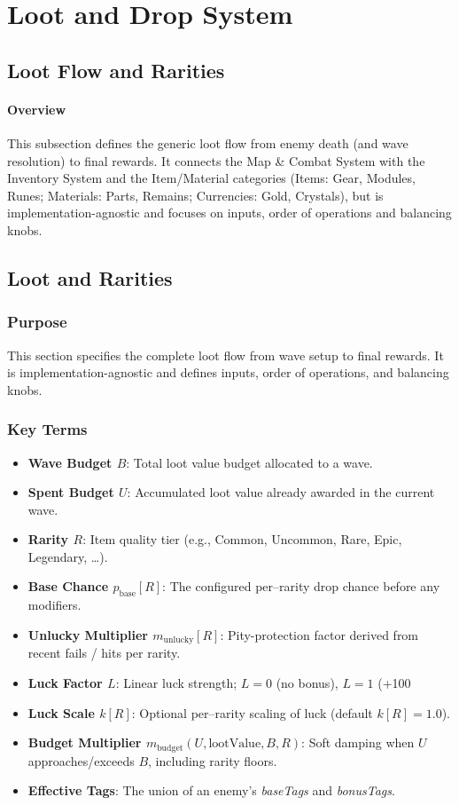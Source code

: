 
\section{Loot and Drop System}
\label{sec:loot-system}

\subsection{Loot Flow and Rarities}

\paragraph{Overview}
This subsection defines the generic loot flow from enemy death (and wave resolution) to final rewards.
It connects the Map \& Combat System with the Inventory System and the Item/Material categories
(Items: Gear, Modules, Runes; Materials: Parts, Remains; Currencies: Gold, Crystals),
but is implementation-agnostic and focuses on inputs, order of operations and balancing knobs.

\subsection{Loot and Rarities}
\subsubsection*{Purpose}
This section specifies the complete loot flow from wave setup to final rewards. It is implementation-agnostic and defines inputs, order of operations, and balancing knobs.

\subsubsection*{Key Terms}
\begin{itemize}
	\item \textbf{Wave Budget $B$}: Total loot value budget allocated to a wave.
	\item \textbf{Spent Budget $U$}: Accumulated loot value already awarded in the current wave.
	\item \textbf{Rarity $R$}: Item quality tier (e.g., Common, Uncommon, Rare, Epic, Legendary, \dots).
	\item \textbf{Base Chance $p_{\text{base}}[R]$}: The configured per–rarity drop chance before any modifiers.
	\item \textbf{Unlucky Multiplier $m_{\text{unlucky}}[R]$}: Pity-protection factor derived from recent fails / hits per rarity.
	\item \textbf{Luck Factor $L$}: Linear luck strength; $L=0$ (no bonus), $L=1$ (+100%
	\item \textbf{Luck Scale $k[R]$}: Optional per–rarity scaling of luck (default $k[R]=1.0$).
	\item \textbf{Budget Multiplier $m_{\text{budget}}(U, \text{lootValue}, B, R)$}: Soft damping when $U$ approaches/exceeds $B$, including rarity floors.
	\item \textbf{Effective Tags}: The union of an enemy’s \emph{baseTags} and \emph{bonusTags}.
\end{itemize}

